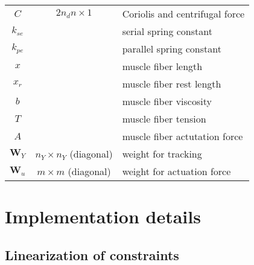 \documentclass[a4paper,10pt]{article}
\begin{document}
\begin{table}[h!b!p!]
\begin{tabular}{ c c l }
$C$              & $2n_d n    \times 1$                     & Coriolis and centrifugal force\\
$k_{se}$         &                                          & serial spring constant\\
$k_{pe}$         &                                          & parallel spring constant\\
$x$              &                                          & muscle fiber length\\
$x_r$            &                                          & muscle fiber rest length\\
$b$              &                                          & muscle fiber viscosity\\
$T$              &                                          & muscle fiber tension\\
$A$              &                                          & muscle fiber actutation force\\
$\mathbf{W}_Y$   &     $n_Y \times n_Y$ (diagonal)   & weight for tracking\\
$\mathbf{W}_u$   &     $ m  \times  m $ (diagonal)   & weight for actuation force\\
\hline
\end{tabular}
\end{table}
\pagebreak



\section{Implementation details}

\subsection{Linearization of constraints}
\end{document}
